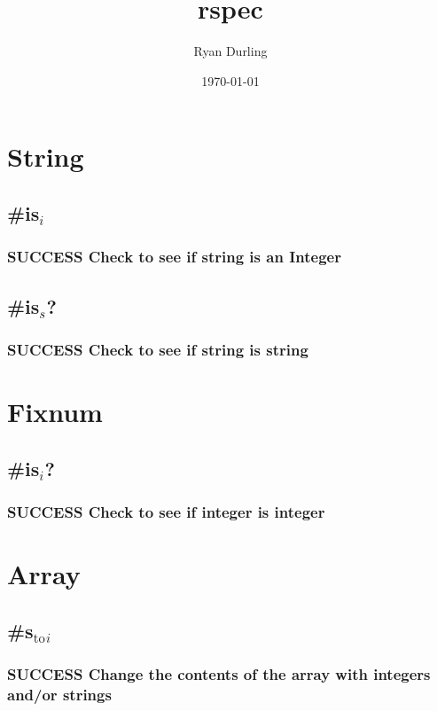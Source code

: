 \documentclass{article}
\title{rspec}
\author{Ryan Durling}
\date{\today}
\begin{document}
\maketitle

\setcounter{tocdepth}{3}
\tableofcontents
\vspace*{1cm}
\section{String}
\label{sec-1}
\subsection{\#is$_i$}
\label{sec-1-1}
\subsubsection{\textbf{SUCCESS} Check to see if string is an Integer}
\label{sec-1-1-1}
\subsection{\#is$_s$?}
\label{sec-1-2}
\subsubsection{\textbf{SUCCESS} Check to see if string is string}
\label{sec-1-2-1}
\section{Fixnum}
\label{sec-2}
\subsection{\#is$_i$?}
\label{sec-2-1}
\subsubsection{\textbf{SUCCESS} Check to see if integer is integer}
\label{sec-2-1-1}
\section{Array}
\label{sec-3}
\subsection{\#s$_{\mathrm{to}}$$_i$}
\label{sec-3-1}
\subsubsection{\textbf{SUCCESS} Change the contents of the array with integers and/or strings}
\label{sec-3-1-1}
\end{document}
